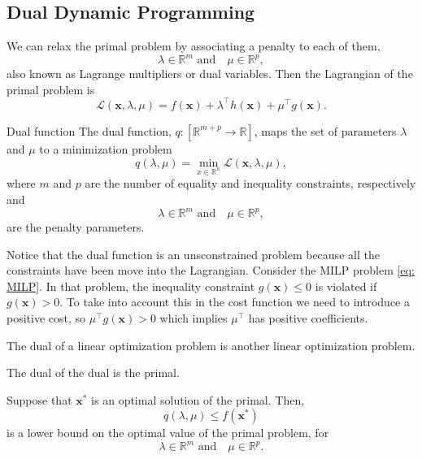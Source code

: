 \subsection{Dual Dynamic Programming}
We can relax the primal problem by associating a penalty to each of them,
\begin{equation}
    \lambda\in\mathbb{R}^{m}\,\, \text{and} \quad \mu\in\mathbb{R}^{p},
\end{equation}
also known as Lagrange multipliers or dual variables. Then the Lagrangian of the primal problem is
\begin{equation}
    \mathcal{L}(\textbf{x}, \lambda, \mu) = f(\textbf{x}) + \lambda^{\intercal}h(\textbf{x}) + \mu^{\intercal}g(\textbf{x}).
\end{equation}
\begin{definition}{Dual function}{}
The dual function, $q: \left[\mathbb{R}^{m+p}\rightarrow\mathbb{R}\right]$, maps the set of parameters $\lambda$ and $\mu$ to a minimization problem
\begin{equation}
    q(\lambda, \mu) = \min_{x\in\mathbb{R}^{n}}\mathcal{L}(\textbf{x}, \lambda, \mu),
\end{equation}
where $m$ and $p$ are the number of equality and inequality constraints, respectively and
\begin{equation}
    \lambda\in\mathbb{R}^{m}\,\, \text{and} \quad \mu\in\mathbb{R}^{p},
\end{equation}
are the penalty parameters.
\end{definition}
Notice that the dual function is an unsconstrained problem because all the constraints have been move into the Lagrangian.
Consider the MILP problem \eqref{eq: MILP}. In that problem, the inequality constraint $g(\textbf{x})\leq 0$ is violated if $g(\textbf{x})>0$. To take into account this in the cost function we need to introduce a positive cost, so $\mu^{\intercal}g(\textbf{x})>0$ which implies $\mu^{\intercal}$ has positive coefficients.
\begin{theorem}{}{}
The dual of a linear optimization problem is another linear optimization problem.
\end{theorem}
\begin{theorem}{}{}
The dual of the dual is the primal.
\end{theorem}
\begin{theorem}{}{}
Suppose that $\textbf{x}^{*}$ is an optimal solution of the primal. Then,
\begin{equation}
    q(\lambda, \mu) \leq f(\textbf{x}^{*})
\end{equation}
is a lower bound on the optimal value of the primal problem, for
\begin{equation}
    \lambda\in\mathbb{R}^{m}\,\, \text{and} \quad \mu\in\mathbb{R}^{p}.
\end{equation}
\end{theorem}
